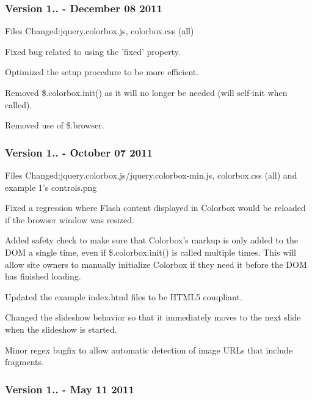 \subsubsection*{Version 1.. -\/ December 08 2011}

Files Changed\-:jquery.\-colorbox.\-js, colorbox.\-css (all)


\begin{DoxyItemize}
\item Fixed bug related to using the 'fixed' property.
\item Optimized the setup procedure to be more efficient.
\item Removed \$.colorbox.\-init() as it will no longer be needed (will self-\/init when called).
\item Removed use of \$.browser.
\end{DoxyItemize}

\subsubsection*{Version 1.. -\/ October 07 2011}

Files Changed\-:jquery.\-colorbox.\-js/jquery.colorbox-\/min.\-js, colorbox.\-css (all) and example 1's controls.\-png


\begin{DoxyItemize}
\item Fixed a regression where Flash content displayed in Colorbox would be reloaded if the browser window was resized.
\item Added safety check to make sure that Colorbox's markup is only added to the D\-O\-M a single time, even if \$.colorbox.\-init() is called multiple times. This will allow site owners to manually initialize Colorbox if they need it before the D\-O\-M has finished loading.
\item Updated the example index.\-html files to be H\-T\-M\-L5 compliant.
\item Changed the slideshow behavior so that it immediately moves to the next slide when the slideshow is started.
\item Minor regex bugfix to allow automatic detection of image U\-R\-Ls that include fragments.
\end{DoxyItemize}

\subsubsection*{Version 1.. -\/ May 11 2011}

